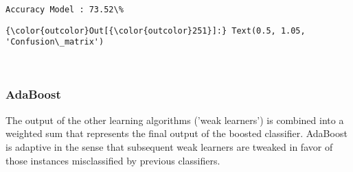 \documentclass[11pt]{article}
\begin{document}
    \begin{Verbatim}[commandchars=\\\{\}]
Accuracy Model : 73.52\% 

    \end{Verbatim}

\begin{Verbatim}[commandchars=\\\{\}]
{\color{outcolor}Out[{\color{outcolor}251}]:} Text(0.5, 1.05, 'Confusion\_matrix')
\end{Verbatim}
            
    \begin{center}
    \end{center}
    { \hspace*{\fill} \\}
    
    \subsubsection{AdaBoost}\label{adaboost}

    The output of the other learning algorithms ('weak learners') is
combined into a weighted sum that represents the final output of the
boosted classifier. AdaBoost is adaptive in the sense that subsequent
weak learners are tweaked in favor of those instances misclassified by
previous classifiers.
\end{document}
